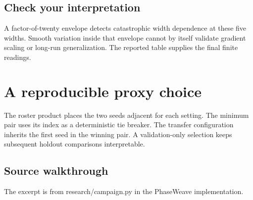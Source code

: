 \documentclass[11pt,oneside,openany]{book}
\begin{document}
\section*{Check your interpretation}
A factor-of-twenty envelope detects catastrophic width dependence at these five widths. Smooth variation inside that envelope cannot by itself validate gradient scaling or long-run generalization. The reported table supplies the final finite readings.

\chapter{A reproducible proxy choice}
The roster product places the two seeds adjacent for each setting. The minimum pair uses its index as a deterministic tie breaker. The transfer configuration inherits the first seed in the winning pair. A validation-only selection keeps subsequent holdout comparisons interpretable.

\section*{Source walkthrough}
The excerpt is from research/campaign.py in the PhaseWeave implementation.
\end{document}
